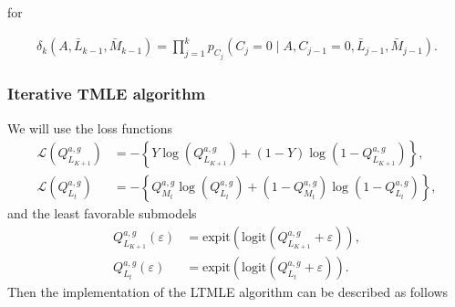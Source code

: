 \documentclass[AMA,STIX1COL]{WileyNJD-v2}
\begin{document}
for 

\begin{align*}
    \delta_k(A, \bar{L}_{k-1}, \bar{M}_{k-1})= \prod_{j=1}^k p_{C_j}(C_j=0 \mid A, C_{j-1}=0, \bar{L}_{j-1}, \bar{M}_{j-1}).
\end{align*}

\subsubsection{Iterative TMLE algorithm}
We will use the loss functions
\begin{align*}
    \mathcal{L}(Q^{a, g}_{L_{K+1}}) &= - \left\{ Y \log \left(Q^{a, g}_{L_{K+1}}\right) + (1-Y) \log \left(1 - Q^{a, g}_{L_{K+1}} \right)\right\}, \\
    \mathcal{L}(Q^{a, g}_{L_{t}}) &= - \left\{ Q_{M_t}^{a, g} \log \left(Q^{a, g}_{L_t}\right) + (1-Q_{M_t}^{a, g}) \log \left(1 - Q^{a, g}_{L_t} \right)\right\},
\end{align*}
and the least favorable submodels
\begin{align*}
    Q^{a, g}_{L_{K+1}}(\varepsilon)&=\text{expit}\left(\text{logit}\left(Q^{a, g}_{L_{K+1}} + \varepsilon \right) \right), \\
    Q^{a, g}_{L_t}(\varepsilon)&=\text{expit}\left(\text{logit}\left(Q^{a, g}_{L_t} + \varepsilon \right)  \right).
\end{align*}
Then the implementation of the LTMLE algorithm can be described as follows
\end{document}
